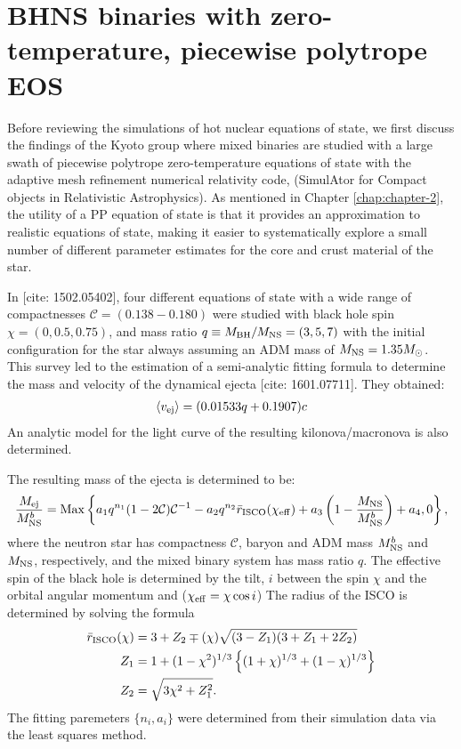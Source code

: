 \section{BHNS binaries with zero-temperature, piecewise polytrope EOS}

Before reviewing the simulations of hot nuclear equations of state, 
we first discuss the findings of the Kyoto group where mixed binaries are studied with a large swath of piecewise polytrope zero-temperature equations of state with the adaptive mesh refinement numerical relativity code, \SACRA (SimulAtor for Compact objects in Relativistic Astrophysics).  
As mentioned in Chapter \ref{chap:chapter-2}, the utility of a PP equation of state is that it provides an approximation to realistic equations of state, making it easier to systematically explore a small number of different parameter estimates for the core and crust material of the star.  

In [cite: 1502.05402], four different equations of state with a wide range of compactnesses $\mathcal{C} = (0.138 - 0.180)$ were studied with black hole spin $\chi = (0, 0.5, 0.75)$, and mass ratio $q \equiv M_{\rm BH}/M_{\rm NS} = (3, 5, 7)$ with the initial configuration for the star always assuming an ADM mass of $M_{\rm NS} = 1.35 M_\odot$.
This survey led to the estimation of a semi-analytic fitting formula to determine the mass and velocity of the dynamical ejecta [cite: 1601.07711].  They obtained:
\begin{align}
\label{e:vej_sacra}
\left\langle v_{\rm ej} \right\rangle = (0.01533 q + 0.1907) c
\end{align}
An analytic model for the light curve of the resulting kilonova/macronova is also determined.

The resulting mass of the ejecta is determined to be:
\begin{align}
\label{e:mass_ejecta}
\frac{M_{\rm ej}}{M^b_{\rm NS}} = 
{\rm Max} 
\left \{ 
a_1 q^{n_1} (1- 2 \mathcal{C})\mathcal{C}^{-1}
-a_2 q^{n_2} \bar{r}_{\rm ISCO}(\chi_{\rm eff} )
+a_3 \left( 1- \frac{M_{\rm NS}}{M^b_{\rm NS}} \right)
+a_4
,
0
\right \},
\end{align}
where the neutron star has compactness $\mathcal{C}$, baryon and ADM mass $M^b_{\rm NS}$ and $M_{\rm NS}$, respectively, and the mixed binary system has mass ratio $q$.
The effective spin of the black hole is determined by the tilt, $i$ between the spin $\chi$ and the orbital angular momentum and ($\chi_{\rm eff} = \chi \cos i$)
The radius of the ISCO is determined by solving the formula
\begin{align}
\label{e:isco_r}
\bar{r}_{\rm ISCO}(\chi) &=
3+Z_2
\mp (\chi)
\sqrt{(3 - Z_1) (3 + Z_1 + 2 Z_2)} \\
\label{e:isco_z1}
Z_1 &= 
1 + (1 - \chi^2)^{1/3}
\left \{ 
(1 + \chi)^{1/3} + (1 - \chi)^{1/3}
\right \}  \\
\label{e:isco_z2}
Z_2 &= \sqrt{3 \chi^2 + Z_1^2}.
\end{align}
The fitting paremeters $\{n_i,a_i\}$ were determined from their simulation data via the least squares method.

